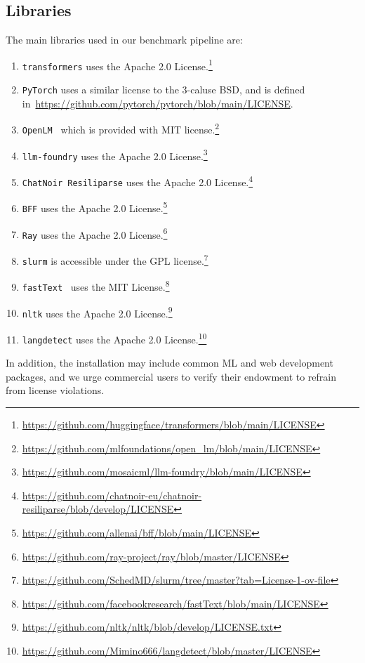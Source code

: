 \documentclass{article}
\newcommand{\fasttext}{\texttt{fastText}\xspace}
\begin{document}
\subsection{Libraries}
The main libraries used in our benchmark pipeline are:
\begin{enumerate}
    \item \texttt{transformers} uses the Apache 2.0 License.\footnote{ \url{https://github.com/huggingface/transformers/blob/main/LICENSE}}
    \item \texttt{PyTorch} uses a similar license to the 3-caluse BSD, and is defined in~\url{https://github.com/pytorch/pytorch/blob/main/LICENSE}.
    \item \texttt{OpenLM}~\citep{open_lm} which is provided with MIT license.\footnote{\url{https://github.com/mlfoundations/open_lm/blob/main/LICENSE}}
    \item \texttt{llm-foundry} uses the Apache 2.0 License.\footnote{\url{https://github.com/mosaicml/llm-foundry/blob/main/LICENSE}}
    \item \texttt{ChatNoir Resiliparse} uses the Apache 2.0 License.\footnote{\url{https://github.com/chatnoir-eu/chatnoir-resiliparse/blob/develop/LICENSE}}
    \item \texttt{BFF} uses the Apache 2.0 License.\footnote{\url{https://github.com/allenai/bff/blob/main/LICENSE}}
    \item \texttt{Ray} uses the Apache 2.0 License.\footnote{\url{https://github.com/ray-project/ray/blob/master/LICENSE}}
    \item \texttt{slurm} is accessible under the GPL license.\footnote{\url{https://github.com/SchedMD/slurm/tree/master?tab=License-1-ov-file}}
    \item \fasttext~\citep{joulin2017bag} uses the MIT License.\footnote{\url{https://github.com/facebookresearch/fastText/blob/main/LICENSE}}
    \item \texttt{nltk} uses the Apache 2.0 License.\footnote{\url{https://github.com/nltk/nltk/blob/develop/LICENSE.txt}}
    \item \texttt{langdetect} uses the Apache 2.0 License.\footnote{\url{https://github.com/Mimino666/langdetect/blob/master/LICENSE}}
\end{enumerate}
In addition, the installation may include common ML and web development packages, and we urge commercial users to verify their endowment to refrain from license violations.


%

\clearpage
\end{document}
